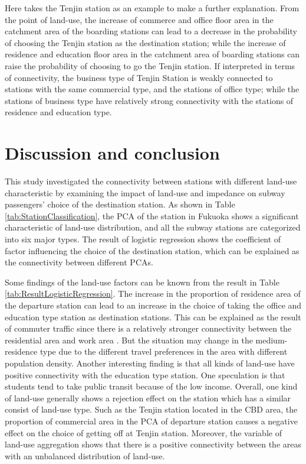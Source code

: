 \documentclass[utf8]{article}
\begin{document}
%
Here takes the Tenjin station as an example to make a further explanation. From the point of land-use, the increase of commerce and office floor area in the catchment area of the boarding stations can lead to a decrease in the probability of choosing the Tenjin station as the destination station; while the increase of residence and education floor area in the catchment area of boarding stations can raise the probability of choosing to go the Tenjin station. If interpreted in terms of connectivity, the business type of Tenjin Station is weakly connected to stations with the same commercial type, and the stations of office type; while the stations of business type have relatively strong connectivity with the stations of residence and education type.

\section{Discussion and conclusion}
\indent

%
This study investigated the connectivity between stations with different land-use characteristic by examining the impact of land-use and impedance on subway passengers' choice of the destination station. As shown in Table \ref{tab:StationClassification}, the PCA of the station in Fukuoka shows a significant characteristic of land-use distribution, and all the subway stations are categorized into six major types. The result of logistic regression shows the coefficient of factor influencing the choice of the destination station, which can be explained as the connectivity between different PCAs.

%
Some findings of the land-use factors can be known from the result in Table \ref{tab:ResultLogisticRegression}. The increase in the proportion of residence area of the departure station can lead to an increase in the choice of taking the office and education type station as destination stations. This can be explained as the result of commuter traffic since there is a relatively stronger connectivity between the residential area and work area \cite{badoe2000transportation}. But the situation may change in the medium-residence type due to the different travel preferences in the area with different population density. Another interesting finding is that all kinds of land-use have positive connectivity with the education type station. One speculation is that students tend to take public transit because of the low income. Overall, one kind of land-use generally shows a rejection effect on the station which has a similar consist of land-use type. Such as the Tenjin station located in the CBD area, the proportion of commercial area in the PCA of departure station causes a negative effect on the choice of getting off at Tenjin station. Moreover, the variable of land-use aggregation shows that there is a positive connectivity between the areas with an unbalanced distribution of land-use.
\end{document}
